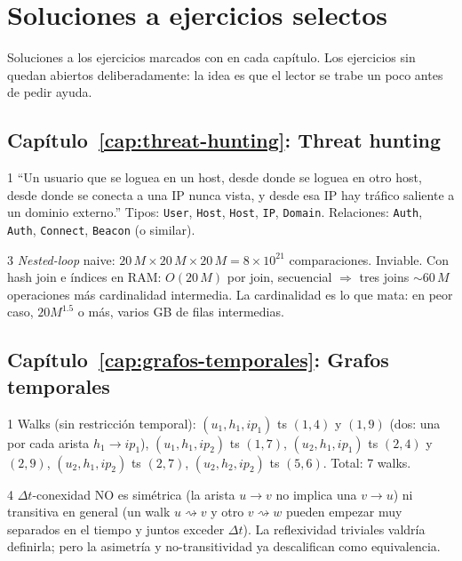 \chapter{Soluciones a ejercicios selectos}
\label{ap:soluciones}

Soluciones a los ejercicios marcados con \starred{} en cada
capítulo. Los ejercicios sin \starred{} quedan abiertos
deliberadamente: la idea es que el lector se trabe un poco antes
de pedir ayuda.

\section*{Capítulo~\ref{cap:threat-hunting}: Threat hunting}

\begin{solucion}{1}
``Un usuario que se loguea en un host, desde donde se loguea en
otro host, desde donde se conecta a una IP nunca vista, y desde
esa IP hay tráfico saliente a un dominio externo.'' Tipos:
\texttt{User}, \texttt{Host}, \texttt{Host}, \texttt{IP},
\texttt{Domain}. Relaciones: \texttt{Auth}, \texttt{Auth},
\texttt{Connect}, \texttt{Beacon} (o similar).
\end{solucion}

\begin{solucion}{3}
\emph{Nested-loop} naive: \(20\,M \times 20\,M \times 20\,M = 8
\times 10^{21}\) comparaciones. Inviable. Con hash join e índices
en RAM: \(O(20\,M)\) por join, secuencial \(\Rightarrow\) tres
joins \(\sim 60\,M\) operaciones más cardinalidad intermedia. La
cardinalidad es lo que mata: en peor caso, \(20M^{1.5}\) o más,
varios GB de filas intermedias.
\end{solucion}

\section*{Capítulo~\ref{cap:grafos-temporales}: Grafos temporales}

\begin{solucion}{1}
Walks (sin restricción temporal):
\((u_1, h_1, ip_1)\) ts \((1, 4)\) y \((1, 9)\) (dos: una por cada
arista \(h_1 \to ip_1\)),
\((u_1, h_1, ip_2)\) ts \((1, 7)\),
\((u_2, h_1, ip_1)\) ts \((2, 4)\) y \((2, 9)\),
\((u_2, h_1, ip_2)\) ts \((2, 7)\),
\((u_2, h_2, ip_2)\) ts \((5, 6)\). Total: 7 walks.
\end{solucion}

\begin{solucion}{4}
\(\Delta t\)-conexidad NO es simétrica (la arista \(u \to v\) no
implica una \(v \to u\)) ni transitiva en general (un walk
\(u \rightsquigarrow v\) y otro \(v \rightsquigarrow w\) pueden
empezar muy separados en el tiempo y juntos exceder \(\Delta t\)).
La reflexividad triviales valdría definirla; pero la asimetría y
no-transitividad ya descalifican como equivalencia.
\end{solucion}

